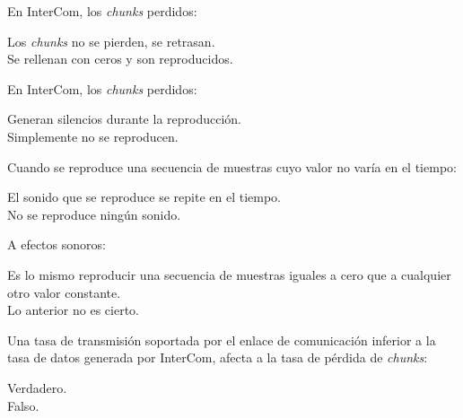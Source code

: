 \documentclass[legalpaper, 12pt, addpoints]{exam}
\begin{document}
\begin{questions}

\question En InterCom, los \emph{chunks} perdidos:

\begin{oneparchoices}
  \choice Los \emph{chunks} no se pierden, se retrasan.\\
  \choice Se rellenan con ceros y son reproducidos.
\end{oneparchoices}
  
\vspace{0.10in}

\question En InterCom, los \emph{chunks} perdidos:

\begin{oneparchoices}
  \choice Generan silencios durante la reproducción.\\
  \choice Simplemente no se reproducen.
\end{oneparchoices}
  
\vspace{0.10in}

\question Cuando se reproduce una secuencia de muestras cuyo valor no varía en el tiempo:

\begin{oneparchoices}
  \choice El sonido que se reproduce se repite en el tiempo.\\
  \choice No se reproduce ningún sonido.
\end{oneparchoices}
  
\vspace{0.10in}

\question A efectos sonoros:

\begin{oneparchoices}
  \choice Es lo mismo reproducir una secuencia de muestras iguales a cero que a cualquier otro valor constante.\\
  \choice Lo anterior no es cierto.
\end{oneparchoices}
  
\vspace{0.10in}

\question Una tasa de transmisión soportada por el enlace de
comunicación inferior a la tasa de datos generada por InterCom, afecta
a la tasa de pérdida de \emph{chunks}:

\begin{oneparchoices}
  \choice Verdadero.\\
  \choice Falso.
\end{oneparchoices}
  

\end{questions}
\end{document}
